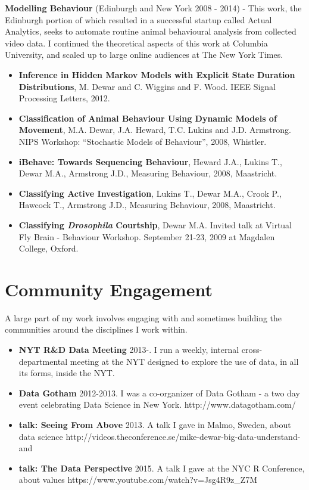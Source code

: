 \documentclass{res}
\begin{document}
\begin{resume}
\textbf{Modelling Behaviour} (Edinburgh and New York 2008 - 2014) - This work, the Edinburgh portion of which resulted in a successful startup called Actual Analytics, seeks to automate routine animal behavioural analysis from collected video data. I continued the theoretical aspects of this work at Columbia University, and scaled up to large online audiences at The New York Times.
    \begin{itemize}
        \item {\bf Inference in Hidden {M}arkov Models with Explicit State Duration Distributions}, M. Dewar and C. Wiggins and F. Wood. IEEE Signal Processing Letters, 2012.
        \item {\bf Classification of Animal Behaviour Using Dynamic Models of Movement},     M.A. Dewar, J.A. Heward, T.C. Lukins and J.D. Armstrong. NIPS Workshop: ``Stochastic Models of Behaviour'', 2008, Whistler. 
        \item {\bf iBehave: Towards Sequencing Behaviour}, Heward J.A., Lukins T., Dewar M.A., Armstrong J.D., Measuring Behaviour, 2008, Maastricht.
        \item {\bf Classifying Active Investigation}, Lukins T., Dewar M.A., Crook P., Hawcock T., Armstrong J.D., Measuring Behaviour, 2008, Maastricht.
	\item {\bf Classifying \emph{Drosophila} Courtship}, Dewar M.A. Invited talk at Virtual Fly Brain - Behaviour Workshop. September 21-23, 2009 at Magdalen College, Oxford.
    \end{itemize}

\section{Community Engagement}

A large part of my work involves engaging with and sometimes building the communities around the disciplines I work within. 
\begin{itemize}
  \item {\bf NYT R\&D Data Meeting} 2013-. I run a weekly, internal cross-departmental meeting at the NYT designed to explore the use of data, in all its forms, inside the NYT. 
  \item {\bf Data Gotham} 2012-2013. I was a co-organizer of Data Gotham - a two day event celebrating Data Science in New York. http://www.datagotham.com/
  \item {\bf talk: Seeing From Above} 2013. A talk I gave in Malmo, Sweden, about data science http://videos.theconference.se/mike-dewar-big-data-understand-and 
    \item {\bf talk: The Data Perspective} 2015. A talk I gave at the NYC R Conference, about values https://www.youtube.com/watch?v=Jsg4R9z_Z7M 


\end{itemize}
\end{resume}
\end{document}
